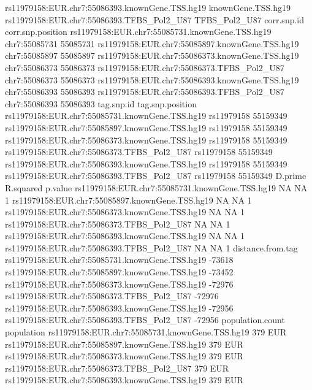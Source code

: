 \documentclass[a4paper]{article}
\begin{document}
\begin{Schunk}
\begin{Soutput}
rs11979158:EUR.chr7:55086393.knownGene.TSS.hg19 knownGene.TSS.hg19
rs11979158:EUR.chr7:55086393.TFBS_Pol2_U87           TFBS_Pol2_U87
                                                  corr.snp.id corr.snp.position
rs11979158:EUR.chr7:55085731.knownGene.TSS.hg19 chr7:55085731          55085731
rs11979158:EUR.chr7:55085897.knownGene.TSS.hg19 chr7:55085897          55085897
rs11979158:EUR.chr7:55086373.knownGene.TSS.hg19 chr7:55086373          55086373
rs11979158:EUR.chr7:55086373.TFBS_Pol2_U87      chr7:55086373          55086373
rs11979158:EUR.chr7:55086393.knownGene.TSS.hg19 chr7:55086393          55086393
rs11979158:EUR.chr7:55086393.TFBS_Pol2_U87      chr7:55086393          55086393
                                                tag.snp.id tag.snp.position
rs11979158:EUR.chr7:55085731.knownGene.TSS.hg19 rs11979158         55159349
rs11979158:EUR.chr7:55085897.knownGene.TSS.hg19 rs11979158         55159349
rs11979158:EUR.chr7:55086373.knownGene.TSS.hg19 rs11979158         55159349
rs11979158:EUR.chr7:55086373.TFBS_Pol2_U87      rs11979158         55159349
rs11979158:EUR.chr7:55086393.knownGene.TSS.hg19 rs11979158         55159349
rs11979158:EUR.chr7:55086393.TFBS_Pol2_U87      rs11979158         55159349
                                                D.prime R.squared p.value
rs11979158:EUR.chr7:55085731.knownGene.TSS.hg19      NA        NA       1
rs11979158:EUR.chr7:55085897.knownGene.TSS.hg19      NA        NA       1
rs11979158:EUR.chr7:55086373.knownGene.TSS.hg19      NA        NA       1
rs11979158:EUR.chr7:55086373.TFBS_Pol2_U87           NA        NA       1
rs11979158:EUR.chr7:55086393.knownGene.TSS.hg19      NA        NA       1
rs11979158:EUR.chr7:55086393.TFBS_Pol2_U87           NA        NA       1
                                                distance.from.tag
rs11979158:EUR.chr7:55085731.knownGene.TSS.hg19            -73618
rs11979158:EUR.chr7:55085897.knownGene.TSS.hg19            -73452
rs11979158:EUR.chr7:55086373.knownGene.TSS.hg19            -72976
rs11979158:EUR.chr7:55086373.TFBS_Pol2_U87                 -72976
rs11979158:EUR.chr7:55086393.knownGene.TSS.hg19            -72956
rs11979158:EUR.chr7:55086393.TFBS_Pol2_U87                 -72956
                                                population.count population
rs11979158:EUR.chr7:55085731.knownGene.TSS.hg19              379        EUR
rs11979158:EUR.chr7:55085897.knownGene.TSS.hg19              379        EUR
rs11979158:EUR.chr7:55086373.knownGene.TSS.hg19              379        EUR
rs11979158:EUR.chr7:55086373.TFBS_Pol2_U87                   379        EUR
rs11979158:EUR.chr7:55086393.knownGene.TSS.hg19              379        EUR

\end{Soutput}
\end{Schunk}
\end{document}
